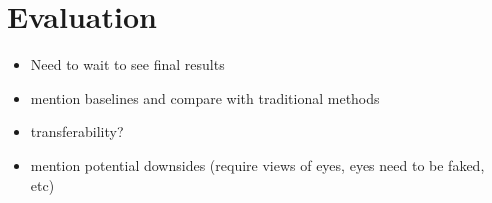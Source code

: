 \chapter{Evaluation}
\label{ch:evaluation}

\begin{itemize}
    \item Need to wait to see final results
    \item mention baselines and compare with traditional methods
    \item transferability?
    \item mention potential downsides (require views of eyes, eyes need to be faked, etc)
\end{itemize}